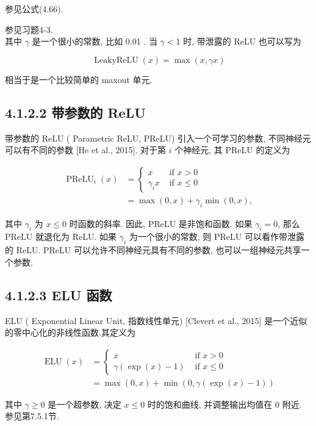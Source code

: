 \documentclass[10pt]{article}
\begin{document}
参见公式(4.66).

参见习题4-3.\\
其中 $\gamma$ 是一个很小的常数, 比如 0.01 . 当 $\gamma<1$ 时, 带泄露的 ReLU 也可以写为


\begin{equation*}
\operatorname{LeakyReLU}(x)=\max (x, \gamma x) \tag{4.20}
\end{equation*}


相当于是一个比较简单的 maxout 单元.

\subsection*{4.1.2.2 带参数的 ReLU}
带参数的 ReLU ( Parametric ReLU, PReLU) 引入一个可学习的参数, 不同神经元可以有不同的参数 [He et al., 2015]. 对于第 $i$ 个神经元, 其 PReLU 的定义为


\begin{align*}
\operatorname{PReLU}_{i}(x) & = \begin{cases}x & \text { if } x>0 \\
\gamma_{i} x & \text { if } x \leq 0\end{cases}  \tag{4.21}\\
& =\max (0, x)+\gamma_{i} \min (0, x), \tag{4.22}
\end{align*}


其中 $\gamma_{i}$ 为 $x \leq 0$ 时函数的斜率. 因此, PReLU 是非饱和函数. 如果 $\gamma_{i}=0$, 那么 PReLU 就退化为 ReLU. 如果 $\gamma_{i}$ 为一个很小的常数, 则 PReLU 可以看作带泄露的 ReLU. PReLU 可以允许不同神经元具有不同的参数, 也可以一组神经元共享一个参数.

\subsection*{4.1.2.3 ELU 函数}
ELU ( Exponential Linear Unit, 指数线性单元) [Clevert et al., 2015] 是一个近似的零中心化的非线性函数,其定义为


\begin{align*}
\operatorname{ELU}(x) & = \begin{cases}x & \text { if } x>0 \\
\gamma(\exp (x)-1) & \text { if } x \leq 0\end{cases}  \tag{4.23}\\
& =\max (0, x)+\min (0, \gamma(\exp (x)-1)) \tag{4.24}
\end{align*}


其中 $\gamma \geq 0$ 是一个超参数, 决定 $x \leq 0$ 时的饱和曲线, 并调整输出均值在 0 附近. 参见第7.5.1节.
\end{document}
